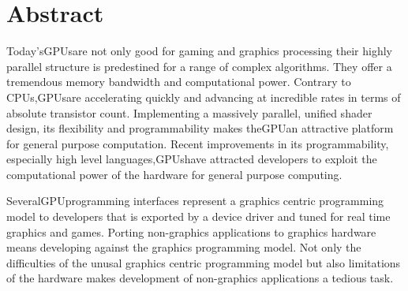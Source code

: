 \begingroup
\let\clearpage\relax
\let\cleardoublepage\relax
\let\cleardoublepage\relax
{}
\section*{Abstract}
Today's\glspl{GPU}are not only good for gaming and graphics processing their highly parallel structure is predestined for a range of complex algorithms. They offer a tremendous memory bandwidth and computational power. Contrary to CPUs,\glspl{GPU}are accelerating quickly and advancing at incredible rates in terms of absolute transistor count. Implementing a massively parallel, unified shader design, its flexibility and programmability makes the\gls{GPU}an attractive platform for general purpose computation. Recent improvements in its programmability, especially high level languages,\glspl{GPU}have attracted developers to exploit the computational power of the hardware for general purpose computing. 

Several\gls{GPU}programming interfaces represent a graphics centric programming
model to developers that is exported by a device driver and tuned for real 
time graphics and games. Porting non-graphics applications to graphics hardware 
means developing against the graphics programming model. Not only the 
difficulties of the unusal graphics centric programming model but also
limitations of the hardware makes development of non-graphics applications a tedious
task. 


